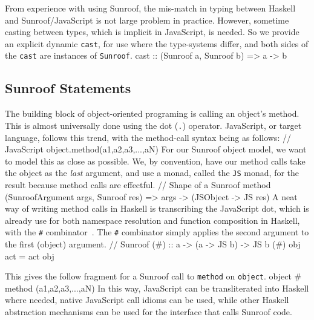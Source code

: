 \documentclass{llncs}
\newcommand{\Src}[1]{{\tt{#1}}}
\newenvironment{Code}{\verbatim}{\endverbatim}
\begin{document}
From experience with using Sunroof,
the mis-match in typing between Haskell and Sunroof/JavaScript
is not large problem in practice.
However, sometime casting between types, which is implicit in JavaScript,
is needed. So we provide an explicit dynamic \Src{cast},
for use where the type-systems differ,
and both sides of the \Src{cast} are instances of \Src{Sunroof}.
\begin{Code}
cast :: (Sunroof a, Sunroof b) => a -> b
\end{Code}

\subsection{Sunroof Statements}

The building block of object-oriented programing is calling an object's method.
This is almost universally done using the dot (\Src{.}) operator. JavaScript, or target language, 
follows this trend, with the method-call syntax being as follows:
\begin{Code}
  // JavaScript
  object.method(a1,a2,a3,...,aN)
\end{Code}
For our Sunroof object model, we want to model this as close as possible.
We, by convention, have our method calls take the object as the {\em last\/} argument,
and use a monad, called the \Src{JS} monad, for the result because method calls are effectful.
\begin{Code}
// Shape of a Sunroof method
(SunroofArgument args, Sunroof res) => args -> (JSObject -> JS res)
\end{Code}
A neat way of writing method calls in Haskell is transcribing the JavaScript dot, which is already use
for both namespace resolution and function composition in Haskell, with the \Src{\#} combinator~\cite{Shields:01:Babel}.
The \Src{\#} combinator simply applies the second argument to the first (object) argument.
\begin{Code}
// Sunroof        
(#) :: a -> (a -> JS b) -> JS b
(#) obj act = act obj
\end{Code}

\noindent
This gives the follow fragment for a Sunroof call to \Src{method} on \Src{object}.
\begin{Code}
  object # method (a1,a2,a3,...,aN)
\end{Code}
In this way, JavaScript can be transliterated into Haskell where needed,
native JavaScript call idioms can be used,
while other Haskell abstraction mechanisms can be used for the interface that calls Sunroof code.
\end{document}
